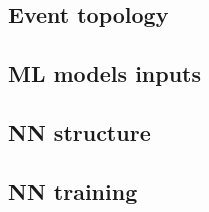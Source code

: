 \subsection*{Event topology}


\subsection*{ML models inputs}


\subsection*{NN structure}


\subsection*{NN training}
